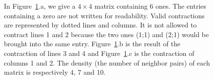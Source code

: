 \begin{figure}[!ht]
	\caption{In Figure~\ref{fig:introduction:example}.a, we give a $4 \times 4$ matrix containing 6 ones. The entries containing a zero are not written for readability. Valid contractions are represented by dotted lines and columns. It is not allowed to contract lines 1 and 2 because the two ones (1;1) and (2;1) would be brought into the same entry. Figure~\ref{fig:introduction:example}.b is the result of the contraction of lines 3 and 4 and Figure~\ref{fig:introduction:example}.c is the contraction of columns 1 and 2. The density (the number of neighbor pairs) of each matrix is respectively 4, 7 and 10.
  }
	\label{fig:introduction:example}
\end{figure}

